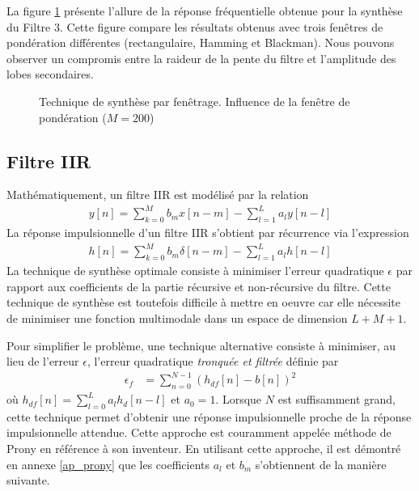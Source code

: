 \documentclass[11pt,a4paper]{IEEEtran}
\begin{document}
La figure \ref{fig_comp_fir} présente l'allure de la réponse fréquentielle obtenue pour la synthèse du Filtre 3. Cette figure compare les résultats obtenus avec trois fenêtres de pondération différentes (rectangulaire, Hamming et Blackman). Nous pouvons observer un compromis entre la raideur de la pente du filtre et l'amplitude des lobes secondaires.
\begin{figure}[t]
\centering
{}
\caption{Technique de synthèse par fenêtrage. Influence de la fenêtre de pondération ($M=200$)}\label{fig_comp_fir}
\end{figure}


\subsection{Filtre IIR}
Mathématiquement, un filtre IIR est modélisé par la relation
\begin{align}
y[n]=\sum_{k=0}^{M} b_m x[n-m]-\sum_{l=1}^{L}a_l y[n-l]
\end{align}
La réponse impulsionnelle d'un filtre IIR s'obtient par récurrence via l'expression
\begin{align}
h[n]=\sum_{k=0}^{M} b_m \delta[n-m]-\sum_{l=1}^{L}a_l h[n-l]
\end{align}
La technique de synthèse optimale consiste à minimiser l'erreur quadratique $\epsilon$ par rapport aux coefficients de la partie récursive et non-récursive du filtre. Cette technique de synthèse est toutefois difficile à mettre en oeuvre car elle nécessite de minimiser une fonction multimodale dans un espace de dimension $L+M+1$. 

Pour simplifier le problème, une technique alternative consiste à minimiser, au lieu de l'erreur $\epsilon$, l'erreur quadratique \textit{tronquée et filtrée} définie par
\begin{align}
\epsilon_f&=\sum_{n=0}^{N-1}(h_{df}[n]-b[n])^2\label{eq_ref_h2}
\end{align}
où $h_{df}[n]=\sum_{l=0}^{L}a_l h_d[n-l]$ et $a_0=1$. Lorsque $N$ est suffisamment grand, cette technique permet d'obtenir une réponse impulsionnelle proche de la réponse impulsionnelle attendue. Cette approche est couramment appelée méthode de Prony en référence à son inventeur. En utilisant cette approche, il est démontré en annexe \ref{ap_prony} que les coefficients $a_l$ et $b_m$ s'obtiennent de la manière suivante.
\end{document}
